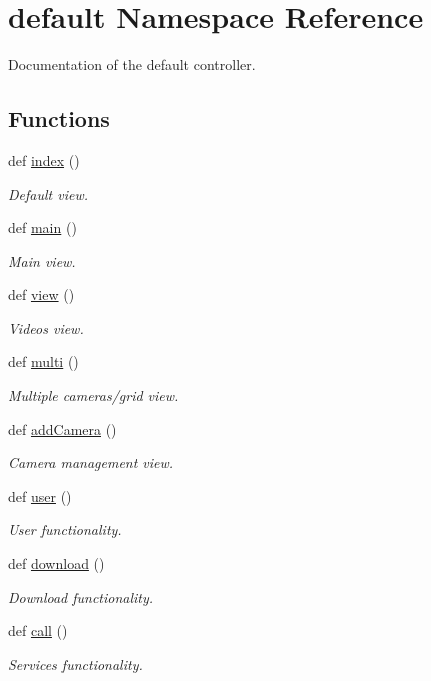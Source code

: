 \hypertarget{namespacedefault}{}\section{default Namespace Reference}
\label{namespacedefault}


Documentation of the default controller.  


\subsection*{Functions}
\begin{DoxyCompactItemize}
\item 
def \hyperlink{namespacedefault_a123594d2c8890b62c80379e191485e3a}{index} ()
\begin{DoxyCompactList}\small\item\em Default view. \end{DoxyCompactList}\item 
def \hyperlink{namespacedefault_ae42db310ea72fd73d154e75b4d3d46f5}{main} ()
\begin{DoxyCompactList}\small\item\em Main view. \end{DoxyCompactList}\item 
def \hyperlink{namespacedefault_a2bed257028509c3e94a4db8fdada8d1e}{view} ()
\begin{DoxyCompactList}\small\item\em Videos view. \end{DoxyCompactList}\item 
def \hyperlink{namespacedefault_a7cdc6aef159950a3288288d454a745b5}{multi} ()
\begin{DoxyCompactList}\small\item\em Multiple cameras/grid view. \end{DoxyCompactList}\item 
def \hyperlink{namespacedefault_a407d6142ab401b6d0c0fd242f0547851}{add\+Camera} ()
\begin{DoxyCompactList}\small\item\em Camera management view. \end{DoxyCompactList}\item 
def \hyperlink{namespacedefault_a0c38fd1bc3457394fdda416d7a956135}{user} ()
\begin{DoxyCompactList}\small\item\em User functionality. \end{DoxyCompactList}\item 
def \hyperlink{namespacedefault_abcdcbacbec033ad1d6212d4feafc554a}{download} ()
\begin{DoxyCompactList}\small\item\em Download functionality. \end{DoxyCompactList}\item 
def \hyperlink{namespacedefault_adb399dd3ab3deaaaef6237d72fdb12e9}{call} ()
\begin{DoxyCompactList}\small\item\em Services functionality. \end{DoxyCompactList}\end{DoxyCompactItemize}


